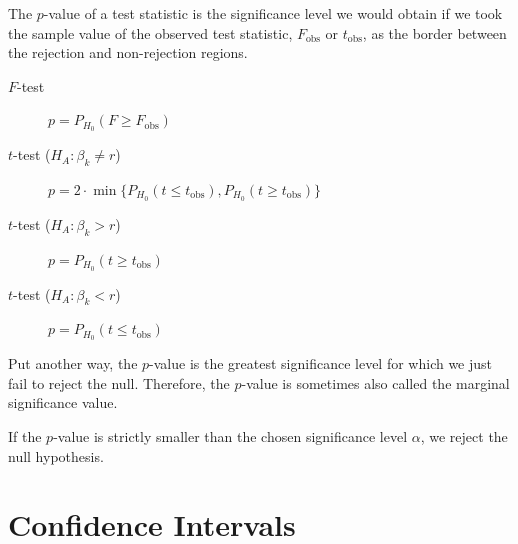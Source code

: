 \documentclass[
  14pt,
]{memoir}
\begin{document}
The \(p\)-value of a test statistic is the significance level we would obtain if we took the sample value of the observed test statistic, \(F_{\text{obs}}\) or \(t_{\text{obs}}\), as the border between the rejection and non-rejection regions.

\begin{description}
\item[$F$-test] $p=P_{H_0}(F\geq F_{\text{obs}})$
\item[$t$-test ($H_A:\beta_k\neq r$)] $p=2\cdot\min\{P_{H_0}(t\leq t_{\text{obs}}),P_{H_0}(t\geq t_{\text{obs}})\}$
\item[$t$-test ($H_A:\beta_k> r$)] $p=P_{H_0}(t\geq t_{\text{obs}})$
\item[$t$-test ($H_A:\beta_k< r$)] $p=P_{H_0}(t\leq t_{\text{obs}})$
\end{description}

Put another way, the \(p\)-value is the greatest significance level for which we just fail to reject the null. Therefore, the \(p\)-value is sometimes also called the marginal significance value.

If the \(p\)-value is strictly smaller than the chosen significance level \(\alpha\), we reject the null hypothesis.

\hypertarget{CIsmallsample}{%
\section{Confidence Intervals}\label{CIsmallsample}}
\end{document}
